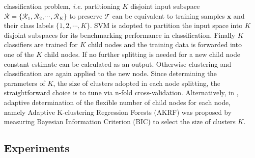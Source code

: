 \documentclass{tutmscthesis}[2010/09/22]
\numberwithin{equation}{section}
\numberwithin{table}{section}
\numberwithin{figure}{section}
\renewcommand{\vec}[1]{\bm{#1}}
\def\onedot{. }
\def\ie{\emph{i.e}\onedot} \def\Ie{\emph{I.e}\onedot}
\begin{document}
classification problem, \ie partitioning $K$ disjoint input subspace
$\mathcal{R} = \{\mathcal{R}_1, \mathcal{R}_2,\cdots, \mathcal{R}_K\}$
to preserve $\mathcal{T}$ can be equivalent to training samples
$\vec{x}$ and their class labels $\{1,2,\cdots, K\}$. 
SVM is adopted to partition the input space into $K$ disjoint subspaces for its benchmarking performance in classification. Finally $K$ classifiers are trained for $K$ child nodes and the training data is forwarded into one of the $K$ child nodes. If no further splitting is needed for a new child node constant estimate can be calculated as an output. Otherwise clustering and classification are again applied to the new node.
Since determining the parameters of $K$, the size of clusters adopted
in each node splitting, the straightforward choice is to tune via
n-fold cross-validation. Alternatively, in  \cite{hara2014growing},
adaptive determination of the flexible number of child nodes for each
node, namely Adaptive K-clustering Regression Forests (AKRF) was
proposed by measuring Bayesian Information Criterion (BIC)
\cite{kashyap1977bayesian, schwarz1978estimating} to select the size of
clusters $K$. 

\subsection{Experiments}
\end{document}
